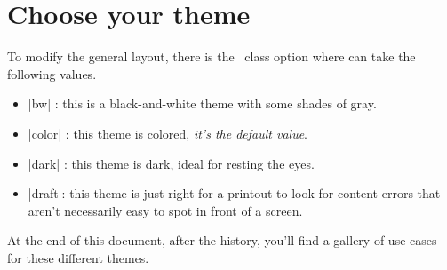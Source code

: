 \documentclass[10pt, a4paper]{tutodoc}
\begin{document}
\section{Choose your theme}

	To modify the general layout, there is the \thisproj\ class option  where  can take the following values.

\begin{itemize}
	\item \tdocinlatex|bw| :
	this is a black-and-white theme with some shades of gray.

	\item \tdocinlatex|color| :
	this theme is colored, \emph{it's the default value}.

	\item \tdocinlatex|dark| :
	this theme is dark, ideal for resting the eyes.

	\item \tdocinlatex|draft|:
	this theme is just right for a printout to look for content errors that aren't necessarily easy to spot in front of a screen.
\end{itemize}


\begin{tdocnote}
	At the end of this document, after the history, you'll find a gallery of use cases for these different themes.
\end{tdocnote}
\end{document}
